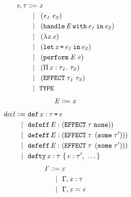 \begin{multicols}{2}
	\begin{align*}
		\mathit{e, \tau}\Coloneqq&\ \mathit{x}\\
		\lvert\ &\ \left(\mathit{e_1}\;\mathit{e_2}\right)\\
		\lvert\ &\ \left(\texttt{handle}\,\mathit{E}\,\texttt{with}\,\mathit{e_1}\,\texttt{in}\,\mathit{e_2}\right)\\
		\lvert\ &\ \left(\lambda\mathit{x}.\mathit{e}\right)\\
		\lvert\ &\ \left(\texttt{let}\,\mathit{x}\,\texttt{=}\,\mathit{e_1}\,\texttt{in}\,\mathit{e_2}\right)\\
		\lvert\ &\ \left(\texttt{perform}\;\mathit{E}\;\mathit{e}\right)\\
		\lvert\ &\ \left(\Pi\,\mathit{x}:\mathit{\tau_1}.\ \mathit{\tau_2}\right)\\
		\lvert\ &\ \left(\texttt{EFFECT}\;\mathit{\tau_1}\;\mathit{\tau_2}\right)\\
		\lvert\ &\ \texttt{TYPE}\\
	\end{align*}
	\begin{align*}
		\mathit{E}\Coloneqq&\ \mathit{x}\\
	\end{align*}
	\break
	\begin{align*}
		\DefineTerm{decl}{\StahlDef{x}{\StahlName{\tau}}{\StahlName{e}}}
		\Case{\StahlDefEffNoReturn{E}{\StahlName{\tau}}}
		\Case{\StahlDefEff{E}{\StahlName{\tau}}{\StahlName{\tau'}}}
		\Case{\StahlDefEff{E}{\StahlName{\tau}}{\StahlName{\tau'}}}
		\Case{\StahlDefTy{x}{\StahlName{\tau}}{\StahlCtor{c}{\tau'},\ \ldots}}
	\end{align*}
	\begin{align*}
		\mathit{\Gamma}\Coloneqq&\ \varepsilon\\
		\lvert\ &\ \Gamma,\mathit{x}:\mathit{\tau}\\
		\lvert\ &\ \Gamma,\mathit{x}=\mathit{e}\\
	\end{align*}
\end{multicols}
